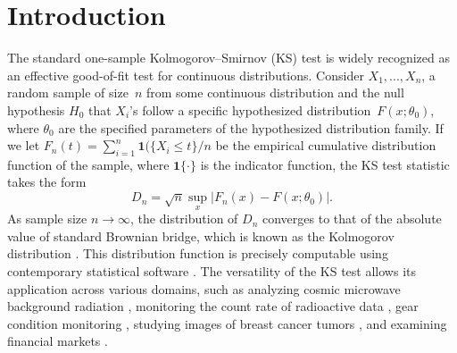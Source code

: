 \documentclass[APA,Times1COL]{WileyNJDv5} %
\begin{document}




\maketitle

\renewcommand\thefootnote{}

\renewcommand\thefootnote{\fnsymbol{footnote}}
\setcounter{footnote}{1}

\section{Introduction}\label{sec:intro}

The standard one-sample Kolmogorov--Smirnov (KS) test is widely
recognized as an effective good-of-fit test for continuous distributions.
Consider $X_1, ..., X_n$, a random sample of size~$n$ from some continuous
distribution and the null hypothesis $H_0$ that $X_i$'s follow a specific
hypothesized distribution~$F(x; \theta_0)$, where $\theta_0$ are the 
specified parameters
of the hypothesized distribution family.
If we let $F_n(t) = \sum_{i=1}^n \mathbf{1}(\{X_i \le t\} / n$ be the empirical cumulative
distribution function of the sample, where $\mathbf{1}\{\cdot\}$ is the indicator
function, the KS test statistic takes the form
\[
  D_n = \sqrt{n} \sup_x | F_{n}(x) - F(x; \theta_0)|.
\]
As sample size $n\to \infty$, the distribution of $D_n$ converges to that of the
absolute value of standard Brownian bridge, which is known as the Kolmogorov
distribution \citep{stephens1974edf}. This distribution function is
precisely computable using contemporary statistical software
\citep{marsaglia2003evaluating}. The versatility of the KS test allows its
application across various domains, such as analyzing cosmic microwave
background radiation \citep{naess2012application}, monitoring the count rate of
radioactive data \citep{aslam2020introducing}, gear condition monitoring
\citep{andrade2001gear}, studying images of breast cancer tumors
\citep{demidenko2004kolmogorov}, and examining financial markets
\citep{lux2001turbulence}.
\end{document}
